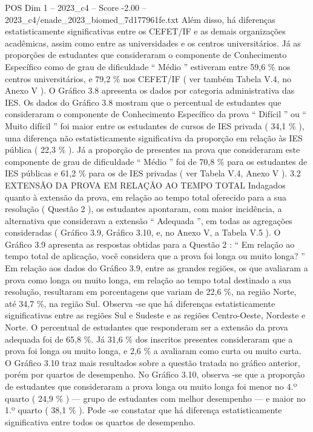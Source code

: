 \begin{textsample}{POS Dim 1 – 2023\_c4 – Score -2.00 – 2023\_c4/enade\_2023\_biomed\_7d177961fe.txt}
Além disso, há diferenças estatisticamente significativas entre os CEFET/IF e as demais organizações acadêmicas, assim como entre as universidades e os centros universitários.
Já as proporções de estudantes que consideraram o componente de Conhecimento Específico como de grau de dificuldade “ Médio ” estiveram entre 59,6 \% nos centros universitários, e 79,2 \% nos CEFET/IF ( ver também Tabela V.4, no Anexo V ).
O Gráfico 3.8 apresenta os dados por categoria administrativa das IES.
Os dados do Gráfico 3.8 mostram que o percentual de estudantes que consideraram o componente de Conhecimento Específico da prova “ Difícil ” ou “ Muito difícil ” foi maior entre os estudantes de cursos de IES privada ( 34,1 \% ), uma diferença não estatisticamente significativa da proporção em relação às IES pública ( 22,3 \% ).
Já a proporção de presentes na prova que consideraram este componente de grau de dificuldade “ Médio ” foi de 70,8 \% para os estudantes de IES públicas e 61,2 \% para os de IES privadas ( ver Tabela V.4, Anexo V ). 3.2 EXTENSÃO DA PROVA EM RELAÇÃO AO TEMPO TOTAL Indagados quanto à extensão da prova, em relação ao tempo total oferecido para a sua resolução ( Questão 2 ), os estudantes apontaram, com maior incidência, a alternativa que considerava a extensão “ Adequada ”, em todas as agregações consideradas ( Gráfico 3.9, Gráfico 3.10, e, no Anexo V, a Tabela V.5 ).
O Gráfico 3.9 apresenta as respostas obtidas para a Questão 2 : “ Em relação ao tempo total de aplicação, você considera que a prova foi longa ou muito longa? ” Em relação aos dados do Gráfico 3.9, entre as grandes regiões, os que avaliaram a prova como longa ou muito longa, em relação ao tempo total destinado a sua resolução, resultaram em porcentagens que variam de 22,6 \%, na região Norte, até 34,7 \%, na região Sul.
Observa -se que há diferenças estatisticamente significativas entre as regiões Sul e Sudeste e as regiões Centro-Oeste, Nordeste e Norte.
O percentual de estudantes que responderam ser a extensão da prova adequada foi de 65,8 \%.
Já 31,6 \% dos inscritos presentes consideraram que a prova foi longa ou muito longa, e 2,6 \% a avaliaram como curta ou muito curta.
O Gráfico 3.10 traz mais resultados sobre a questão tratada no gráfico anterior, porém por quartos de desempenho.
No Gráfico 3.10, observa -se que a proporção de estudantes que consideraram a prova longa ou muito longa foi menor no 4.º quarto ( 24,9 \% ) — grupo de estudantes com melhor desempenho — e maior no 1.º quarto ( 38,1 \% ).
Pode -se constatar que há diferença estatisticamente significativa entre todos os quartos de desempenho.

\end{textsample}

